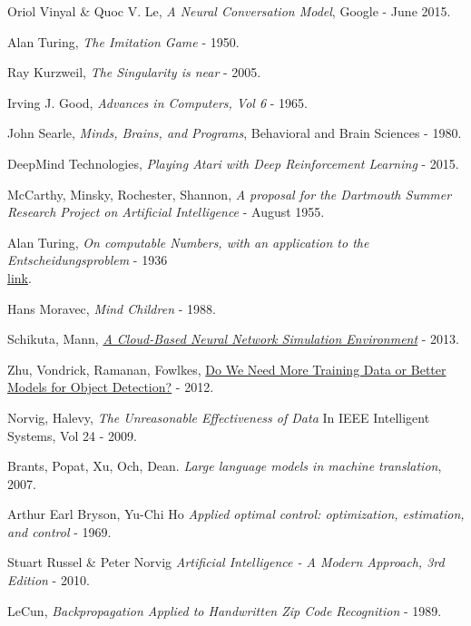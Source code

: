 \documentclass[12pt]{article}
\begin{document}
\begin{thebibliography}{40}

   Oriol Vinyal \& Quoc V. Le,
  {\em A Neural Conversation Model}, Google - June 2015.

   Alan Turing, {\em The Imitation Game} - 1950.

   Ray Kurzweil, {\em The Singularity is near} - 2005.

   Irving J. Good, {\em Advances in Computers, Vol 6} - 1965.

   John Searle, {\em Minds, Brains, and Programs},
  Behavioral and Brain Sciences - 1980.

   DeepMind Technologies, {\em Playing Atari with Deep
  Reinforcement Learning} - 2015.

   McCarthy, Minsky, Rochester, Shannon, {\em
  A proposal for the Dartmouth Summer Research Project on Artificial
  Intelligence} - August 1955.

   Alan Turing, {\em On computable Numbers, with an
  application to the Entscheidungsproblem} - 1936 \\
  \href{http://www.cs.virginia.edu/~robins/Turing_Paper_1936.pdf}{link}.

   Hans Moravec, {\em Mind Children} - 1988.

   Schikuta, Mann,
  \href{http://eprints.cs.univie.ac.at/3708/1/paper57.pdf}
  {{\em A Cloud-Based Neural Network Simulation Environment}} - 2013.

   Zhu, Vondrick, Ramanan, Fowlkes,
  \href{http://web.mit.edu/vondrick/largetrain.pdf}
  {Do We Need More Training Data or Better Models for Object Detection?} - 2012.

   Norvig, Halevy, {\em The Unreasonable Effectiveness of Data}
  In IEEE Intelligent Systems, Vol 24 - 2009.

   Brants, Popat, Xu, Och, Dean. {\em Large language models in machine
  translation}, 2007.

   Arthur Earl Bryson, Yu-Chi Ho
  {\em Applied optimal control: optimization, estimation, and control} - 1969.

   Stuart Russel \& Peter Norvig
  {\em Artificial Intelligence - A Modern Approach, 3rd Edition} - 2010.

   LeCun,
  {\em Backpropagation Applied to Handwritten Zip Code Recognition} - 1989.

\end{thebibliography}
\end{document}

